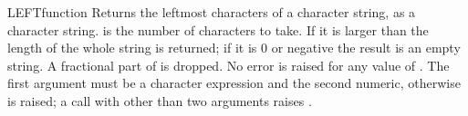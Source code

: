 \begin{XbaseEntry}{LEFT}{function}
Returns the leftmost characters of a character string, as a character string.
\Syntax
{}
\Usage
{} is the number of characters to take. If it is larger than the length of  the whole string is returned; if it is 0 or negative the result is an empty string. A fractional part of  is dropped. No error is raised for any value of . The first argument must be a character expression and the second numeric, otherwise  is raised; a call with other than two arguments raises .
\Examples
{}
\end{XbaseEntry}

